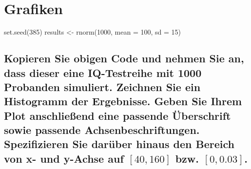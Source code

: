 \documentclass[12pt,a4paper]{article}
\newenvironment{Shaded}{\begin{snugshade}}{\end{snugshade}}
\newcommand{\AttributeTok}[1]{\textcolor[rgb]{0.77,0.63,0.00}{#1}}
\newcommand{\DecValTok}[1]{\textcolor[rgb]{0.00,0.00,0.81}{#1}}
\newcommand{\FunctionTok}[1]{\textcolor[rgb]{0.00,0.00,0.00}{#1}}
\newcommand{\NormalTok}[1]{#1}
\newcommand{\OtherTok}[1]{\textcolor[rgb]{0.56,0.35,0.01}{#1}}
\begin{document}
\newpage

\hypertarget{grafiken}{%
\section{Grafiken}\label{grafiken}}

\begin{Shaded}
\begin{Highlighting}[]
\FunctionTok{set.seed}\NormalTok{(}\DecValTok{385}\NormalTok{)}
\NormalTok{results }\OtherTok{\textless{}{-}} \FunctionTok{rnorm}\NormalTok{(}\DecValTok{1000}\NormalTok{, }\AttributeTok{mean =} \DecValTok{100}\NormalTok{, }\AttributeTok{sd =} \DecValTok{15}\NormalTok{)}
\end{Highlighting}
\end{Shaded}

\hypertarget{kopieren-sie-obigen-code-und-nehmen-sie-an-dass-dieser-eine-iq-testreihe-mit-1000-probanden-simuliert.-zeichnen-sie-ein-histogramm-der-ergebnisse.-geben-sie-ihrem-plot-anschlieuxdfend-eine-passende-uxfcberschrift-sowie-passende-achsenbeschriftungen.-spezifizieren-sie-daruxfcber-hinaus-den-bereich-von-x--und-y-achse-auf-40160-bzw.-00.03.}{%
\subsection{\texorpdfstring{Kopieren Sie obigen Code und nehmen Sie an,
dass dieser eine IQ-Testreihe mit 1000 Probanden simuliert. Zeichnen Sie
ein Histogramm der Ergebnisse. Geben Sie Ihrem Plot anschließend eine
passende Überschrift sowie passende Achsenbeschriftungen. Spezifizieren
Sie darüber hinaus den Bereich von x- und y-Achse auf \([40,160]\) bzw.
\([0,0.03]\).}{Kopieren Sie obigen Code und nehmen Sie an, dass dieser eine IQ-Testreihe mit 1000 Probanden simuliert. Zeichnen Sie ein Histogramm der Ergebnisse. Geben Sie Ihrem Plot anschließend eine passende Überschrift sowie passende Achsenbeschriftungen. Spezifizieren Sie darüber hinaus den Bereich von x- und y-Achse auf {[}40,160{]} bzw. {[}0,0.03{]}.}}\label{kopieren-sie-obigen-code-und-nehmen-sie-an-dass-dieser-eine-iq-testreihe-mit-1000-probanden-simuliert.-zeichnen-sie-ein-histogramm-der-ergebnisse.-geben-sie-ihrem-plot-anschlieuxdfend-eine-passende-uxfcberschrift-sowie-passende-achsenbeschriftungen.-spezifizieren-sie-daruxfcber-hinaus-den-bereich-von-x--und-y-achse-auf-40160-bzw.-00.03.}}
\end{document}
